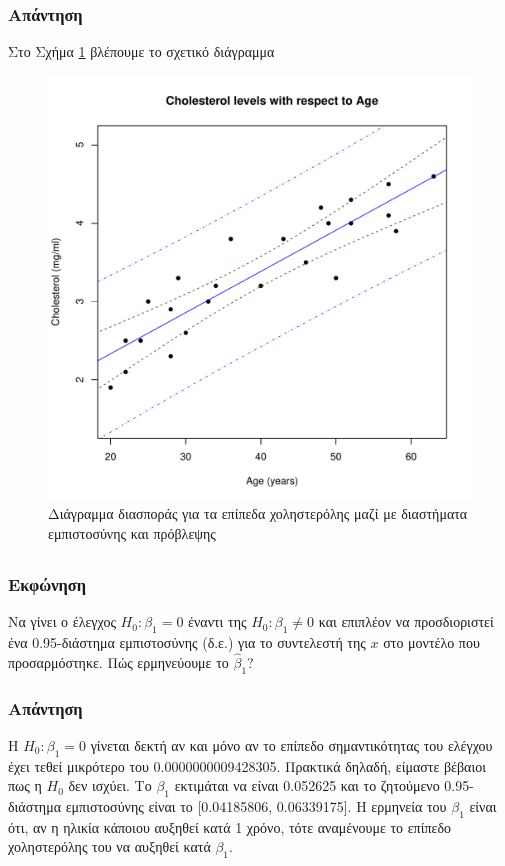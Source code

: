 \documentclass{article}
\newcommand{\hb}{\hat{\beta}}
\begin{document}
\subsubsection*{Απάντηση}
Στο Σχήμα \ref{fig:part-b-scatter} βλέπουμε το σχετικό διάγραμμα 
\begin{figure}[h]
    \centering
    \includegraphics[width=1.0\textwidth]{part-b-scatter.pdf}
    \caption{Διάγραμμα διασποράς για τα επίπεδα χοληστερόλης μαζί με διαστήματα εμπιστοσύνης και πρόβλεψης}
    \label{fig:part-b-scatter}
\end{figure}

\subsection{}
\subsubsection*{Εκφώνηση}
Να γίνει ο έλεγχος \(H_0: \beta_1 = 0\) έναντι της \(H_0: \beta_1 \neq 0\) και επιπλέον να προσδιοριστεί
ένα 0.95-διάστημα εμπιστοσύνης (δ.ε.) για το συντελεστή της \(x\) στο μοντέλο που
προσαρμόστηκε. Πώς ερμηνεύουμε το \(\hb_1\)?
\subsubsection*{Απάντηση}
Η \(H_0: \beta_1 = 0\) γίνεται δεκτή αν και μόνο αν το επίπεδο σημαντικότητας του ελέγχου έχει τεθεί μικρότερο του 0.0000000009428305.
Πρακτικά δηλαδή, είμαστε βέβαιοι πως η \(H_0\) δεν ισχύει.
Το \(\beta_1\) εκτιμάται να είναι 0.052625 και το ζητούμενο 0.95-διάστημα εμπιστοσύνης είναι το [0.04185806, 0.06339175].
Η ερμηνεία του \(\beta_1\) είναι ότι, αν η ηλικία κάποιου αυξηθεί κατά 1 χρόνο,
τότε αναμένουμε το επίπεδο χοληστερόλης του να αυξηθεί κατά \(\beta_1\).
\end{document}
